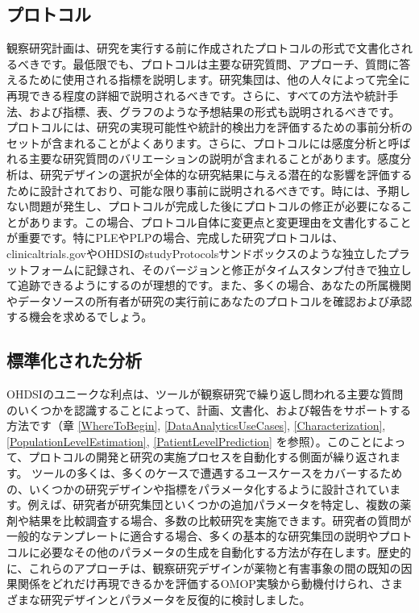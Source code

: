 \documentclass[
  11pt]{book}
\theoremstyle{definition}
\theoremstyle{definition}
\theoremstyle{definition}
\theoremstyle{definition}
\theoremstyle{remark}
\begin{document}
\subsection{プロトコル}\label{ux30d7ux30edux30c8ux30b3ux30eb}


観察研究計画は、研究を実行する前に作成されたプロトコルの形式で文書化されるべきです。最低限でも、プロトコルは主要な研究質問、アプローチ、質問に答えるために使用される指標を説明します。研究集団は、他の人々によって完全に再現できる程度の詳細で説明されるべきです。さらに、すべての方法や統計手法、および指標、表、グラフのような予想結果の形式も説明されるべきです。
プロトコルには、研究の実現可能性や統計的検出力を評価するための事前分析のセットが含まれることがよくあります。さらに、プロトコルには感度分析と呼ばれる主要な研究質問のバリエーションの説明が含まれることがあります。感度分析は、研究デザインの選択が全体的な研究結果に与える潜在的な影響を評価するために設計されており、可能な限り事前に説明されるべきです。時には、予期しない問題が発生し、プロトコルが完成した後にプロトコルの修正が必要になることがあります。この場合、プロトコル自体に変更点と変更理由を文書化することが重要です。特にPLEやPLPの場合、完成した研究プロトコルは、clinicaltrials.govやOHDSIのstudyProtocolsサンドボックスのような独立したプラットフォームに記録され、そのバージョンと修正がタイムスタンプ付きで独立して追跡できるようにするのが理想的です。また、多くの場合、あなたの所属機関やデータソースの所有者が研究の実行前にあなたのプロトコルを確認および承認する機会を求めるでしょう。

\subsection{標準化された分析}\label{ux6a19ux6e96ux5316ux3055ux308cux305fux5206ux6790}

OHDSIのユニークな利点は、ツールが観察研究で繰り返し問われる主要な質問のいくつかを認識することによって、計画、文書化、および報告をサポートする方法です（章 \ref{WhereToBegin}, \ref{DataAnalyticsUseCases}, \ref{Characterization}, \ref{PopulationLevelEstimation}, \ref{PatientLevelPrediction} を参照）。このことによって、プロトコルの開発と研究の実施プロセスを自動化する側面が繰り返されます。
ツールの多くは、多くのケースで遭遇するユースケースをカバーするための、いくつかの研究デザインや指標をパラメータ化するように設計されています。例えば、研究者が研究集団といくつかの追加パラメータを特定し、複数の薬剤や結果を比較調査する場合、多数の比較研究を実施できます。研究者の質問が一般的なテンプレートに適合する場合、多くの基本的な研究集団の説明やプロトコルに必要なその他のパラメータの生成を自動化する方法が存在します。歴史的に、これらのアプローチは、観察研究デザインが薬物と有害事象の間の既知の因果関係をどれだけ再現できるかを評価するOMOP実験から動機付けられ、さまざまな研究デザインとパラメータを反復的に検討しました。
\end{document}
